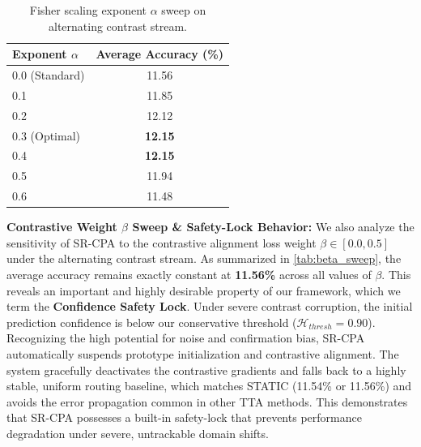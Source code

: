 \documentclass{article}
\theoremstyle{plain}
\theoremstyle{definition}
\theoremstyle{remark}
\begin{document}
\begin{table}[h]
\caption{Fisher scaling exponent $\alpha$ sweep on alternating contrast stream.}
\label{tab:alpha_sweep}
\begin{center}
\begin{small}
\begin{tabular}{lc}
\toprule
Exponent $\alpha$ & Average Accuracy (\%) \\
\midrule
0.0 (Standard) & 11.56 \\
0.1            & 11.85 \\
0.2            & 12.12 \\
0.3 (Optimal)  & \textbf{12.15} \\
0.4            & \textbf{12.15} \\
0.5            & 11.94 \\
0.6            & 11.48 \\
\bottomrule
\end{tabular}
\end{small}
\end{center}
\end{table}

\textbf{Contrastive Weight $\beta$ Sweep \& Safety-Lock Behavior:} We also analyze the sensitivity of SR-CPA to the contrastive alignment loss weight $\beta \in [0.0, 0.5]$ under the alternating contrast stream. As summarized in \cref{tab:beta_sweep}, the average accuracy remains exactly constant at \textbf{11.56\%} across all values of $\beta$. This reveals an important and highly desirable property of our framework, which we term the \textbf{Confidence Safety Lock}. Under severe contrast corruption, the initial prediction confidence is below our conservative threshold ($\mathcal{H}_{thresh} = 0.90$). Recognizing the high potential for noise and confirmation bias, SR-CPA automatically suspends prototype initialization and contrastive alignment. The system gracefully deactivates the contrastive gradients and falls back to a highly stable, uniform routing baseline, which matches STATIC (11.54\% or 11.56\%) and avoids the error propagation common in other TTA methods. This demonstrates that SR-CPA possesses a built-in safety-lock that prevents performance degradation under severe, untrackable domain shifts.
\end{document}
